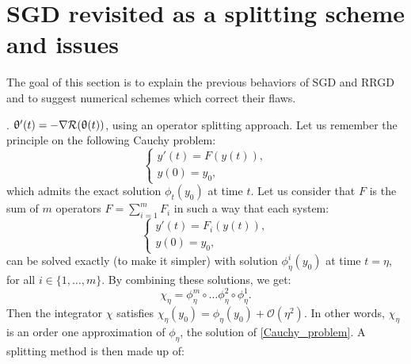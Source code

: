\documentclass[article,authoryear,jmlmc]{beg_32}             %
\begin{document}
\section{SGD revisited as a splitting scheme and issues}
\label{section_splitting_schemes}

The goal of this section is to explain the previous behaviors of SGD and RRGD and to suggest numerical schemes which correct their flaws. 

 \cite{SDE_comparison,SDE_modified,SDE_edp,malladi_adam,hu2018diffusion,flat_minima_exponential,yang2020fast,sgd_implicit_regularisation,sgd_implicit_regularisation2}. 
$\uptheta'(t)=-\nabla \mathcal{R}(\uptheta(t))$, using an operator splitting approach. Let us remember the principle on the following Cauchy problem:
\begin{equation}
	\left\{
	\begin{array}{ll}
		y'(t) = F(y(t)), \\
		y(0) = y_0,
	\end{array}
	\right.
	\label{Cauchy_problem}
\end{equation}
which admits the exact solution $\phi_t(y_0)$ at time $t$. Let us consider that $F$ is the sum of $m$ operators $F=\displaystyle{\sum_{i=1}^m}F_i$ in such a way that each system:
\begin{equation*}
	\left\{
	\begin{array}{ll}
		y'(t) = F_i(y(t)), \\
		y(0) = y_0,
	\end{array}
	\right.
\end{equation*}
can be solved exactly (to make it simpler)  with solution $\phi_{\eta}^i(y_0)$ at time $t=\eta$, for all $i\in \{1,\dots,m\}$. By combining these solutions, we get:
\begin{equation}
	\chi_{\eta} = \phi_{\eta}^m \circ \dots \phi_{\eta}^2 \circ \phi_{\eta}^1.
	\label{splitting_lie_trotter}
\end{equation} 
Then the integrator $\chi$ satisfies $\chi_{\eta}(y_0) = \phi_{\eta}(y_0) + \mathcal{O}(\eta^2)$. In other words, $\chi_{\eta}$ is an order one approximation of $\phi_{\eta}$, the solution of \eqref{Cauchy_problem}. A splitting method is then made up of:
\end{document}
